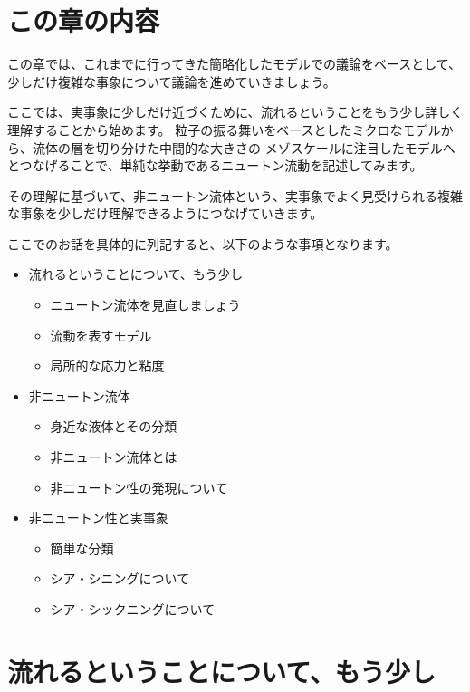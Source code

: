 \documentclass[uplatex,dvipdfmx,a4paper,11pt]{jsarticle}
\begin{document}
\section*{この章の内容}

この章では、これまでに行ってきた簡略化したモデルでの議論をベースとして、少しだけ複雑な事象について議論を進めていきましょう。

ここでは、実事象に少しだけ近づくために、流れるということをもう少し詳しく理解することから始めます。
粒子の振る舞いをベースとしたミクロなモデルから、流体の層を切り分けた中間的な大きさの
メゾスケールに注目したモデルへとつなげることで、単純な挙動であるニュートン流動を記述してみます。

その理解に基づいて、非ニュートン流体という、実事象でよく見受けられる複雑な事象を少しだけ理解できるようにつなげていきます。

ここでのお話を具体的に列記すると、以下のような事項となります。
\begin{boxnote}
    \begin{itemize}
		\item 流れるということについて、もう少し
		\begin{itemize}
			\item ニュートン流体を見直しましょう
			\item 流動を表すモデル
			\item 局所的な応力と粘度
		\end{itemize} 
		\item 非ニュートン流体
		\begin{itemize}
			\item 身近な液体とその分類
			\item 非ニュートン流体とは
			\item 非ニュートン性の発現について
		\end{itemize} 
		\item 非ニュートン性と実事象
		\begin{itemize}
			\item 簡単な分類
			\item シア・シニングについて
			\item シア・シックニングについて
		\end{itemize}
	\end{itemize}
\end{boxnote}

\section{流れるということについて、もう少し}
\end{document}
